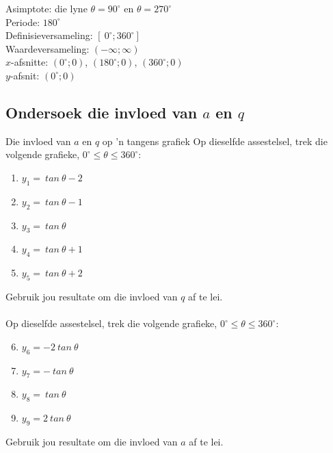 \begin{wex}
{Asimptote: die lyne $\theta = 90^{\circ}$ en $\theta = 270^{\circ}$ \\

Periode: $180^{\circ}$ \\
Definisieversameling: $[~0^{\circ}; 360^{\circ}]$\\
Waardeversameling: $(-\infty;\infty)$\\
$x$-afsnitte: $(0^{\circ}; 0)$, $(180^{\circ}; 0)$, $(360^{\circ}; 0)$\\
$y$-afsnit: $(0^{\circ};0)$
}
\end{wex}

      

\subsection*{Ondersoek die invloed van $a$ en $q$}
\nopagebreak
\begin{Investigation}{Die invloed van $a$ en $q$ op 'n tangens grafiek}
Op dieselfde assestelsel, trek die volgende grafieke, $0^{\circ}\leq\theta\leq360^{\circ}$:
\begin{enumerate}[noitemsep, label=\textbf{\arabic*}. ] 
\item $y_1=~tan~\theta -2$
\item $y_2=~tan~\theta -1$
\item $y_3=~tan~\theta $
\item $y_4=~tan~\theta +1$
\item $y_5=~tan~\theta +2$
\end{enumerate}
Gebruik jou resultate om die invloed van $q$ af te lei.\\
\\
Op dieselfde assestelsel, trek die volgende grafieke, $0^{\circ}\leq\theta\leq360^{\circ}$:
\begin{enumerate}[noitemsep, label=\textbf{\arabic*}. ] \setcounter{enumi}{5}
\item $y_6=-2~tan~\theta $
\item $y_7=-~tan~\theta $
\item $y_8=~tan~\theta $
\item $y_9=2~tan~\theta $
\end{enumerate}
Gebruik jou resultate om die invloed van $a$ af te lei.
\end{Investigation}


